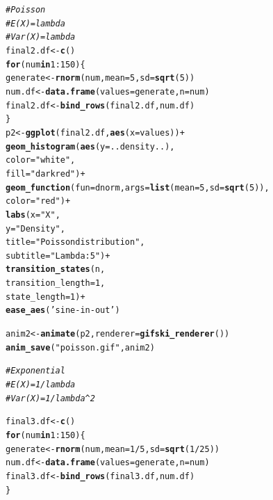 \documentclass{article}\usepackage[]{graphicx}\usepackage[]{color}
\makeatletter
\newcommand{\hlnum}[1]{\textcolor[rgb]{0.686,0.059,0.569}{#1}}%
\newcommand{\hlstr}[1]{\textcolor[rgb]{0.192,0.494,0.8}{#1}}%
\newcommand{\hlcom}[1]{\textcolor[rgb]{0.678,0.584,0.686}{\textit{#1}}}%
\newcommand{\hlopt}[1]{\textcolor[rgb]{0,0,0}{#1}}%
\newcommand{\hlstd}[1]{\textcolor[rgb]{0.345,0.345,0.345}{#1}}%
\newcommand{\hlkwa}[1]{\textcolor[rgb]{0.161,0.373,0.58}{\textbf{#1}}}%
\newcommand{\hlkwb}[1]{\textcolor[rgb]{0.69,0.353,0.396}{#1}}%
\newcommand{\hlkwc}[1]{\textcolor[rgb]{0.333,0.667,0.333}{#1}}%
\newcommand{\hlkwd}[1]{\textcolor[rgb]{0.737,0.353,0.396}{\textbf{#1}}}%
\newenvironment{kframe}{%
 \def\at@end@of@kframe{}%
 \ifinner\ifhmode%
  \def\at@end@of@kframe{\end{minipage}}%
  \begin{minipage}{\columnwidth}%
 \fi\fi%
 \def\FrameCommand##1{\hskip\@totalleftmargin \hskip-\fboxsep
 \colorbox{shadecolor}{##1}\hskip-\fboxsep
     \hskip-\linewidth \hskip-\@totalleftmargin \hskip\columnwidth}%
 \MakeFramed {\advance\hsize-\width
   \@totalleftmargin\z@ \linewidth\hsize
   \@setminipage}}%
 {\par\unskip\endMakeFramed%
 \at@end@of@kframe}
\newenvironment{knitrout}{}{} %
\makeatother
\begin{document}
\begin{knitrout}
\begin{kframe}
\begin{alltt}
\hlcom{#Poisson}
\hlcom{#E(X)=lambda}
\hlcom{#Var(X)=lambda}
\hlstd{final2.df} \hlkwb{<-} \hlkwd{c}\hlstd{()}
\hlkwa{for}\hlstd{(num} \hlkwa{in} \hlnum{1}\hlopt{:}\hlnum{150}\hlstd{)\{}
  \hlstd{generate} \hlkwb{<-} \hlkwd{rnorm}\hlstd{(num,} \hlkwc{mean}\hlstd{=}\hlnum{5}\hlstd{,} \hlkwc{sd}\hlstd{=}\hlkwd{sqrt}\hlstd{(}\hlnum{5}\hlstd{))}
  \hlstd{num.df} \hlkwb{<-} \hlkwd{data.frame}\hlstd{(}\hlkwc{values}\hlstd{=generate,} \hlkwc{n}\hlstd{=num)}
  \hlstd{final2.df}\hlkwb{<-}\hlkwd{bind_rows}\hlstd{(final2.df, num.df)}
\hlstd{\}}
\hlstd{p2}\hlkwb{<-}\hlkwd{ggplot}\hlstd{(final2.df,} \hlkwd{aes}\hlstd{(}\hlkwc{x}\hlstd{=values))}\hlopt{+}
  \hlkwd{geom_histogram}\hlstd{(}\hlkwd{aes}\hlstd{(}\hlkwc{y}\hlstd{=..density..),}
                 \hlkwc{color}\hlstd{=}\hlstr{"white"}\hlstd{,}
                 \hlkwc{fill}\hlstd{=}\hlstr{"dark red"}\hlstd{)}\hlopt{+}
  \hlkwd{geom_function}\hlstd{(}\hlkwc{fun}\hlstd{=dnorm,} \hlkwc{args}\hlstd{=}\hlkwd{list}\hlstd{(}\hlkwc{mean}\hlstd{=}\hlnum{5}\hlstd{,} \hlkwc{sd}\hlstd{=}\hlkwd{sqrt}\hlstd{(}\hlnum{5}\hlstd{)),}
                \hlkwc{color}\hlstd{=}\hlstr{"red"}\hlstd{)}\hlopt{+}
  \hlkwd{labs}\hlstd{(}\hlkwc{x}\hlstd{=}\hlstr{"X"}\hlstd{,}
       \hlkwc{y}\hlstd{=}\hlstr{"Density"}\hlstd{,}
       \hlkwc{title}\hlstd{=}\hlstr{"Poisson distribution"}\hlstd{,}
       \hlkwc{subtitle}\hlstd{=}\hlstr{"Lambda: 5"}\hlstd{)}\hlopt{+}
  \hlkwd{transition_states}\hlstd{(n,}
                    \hlkwc{transition_length} \hlstd{=} \hlnum{1}\hlstd{,}
                    \hlkwc{state_length} \hlstd{=} \hlnum{1}\hlstd{)}\hlopt{+}
  \hlkwd{ease_aes}\hlstd{(}\hlstr{'sine-in-out'}\hlstd{)}

\hlstd{anim2} \hlkwb{<-} \hlkwd{animate}\hlstd{(p2,} \hlkwc{renderer} \hlstd{=} \hlkwd{gifski_renderer}\hlstd{())}
\hlkwd{anim_save}\hlstd{(}\hlstr{"poisson.gif"}\hlstd{, anim2)}


\hlcom{#Exponential}
\hlcom{#E(X)=1/lambda}
\hlcom{#Var(X)=1/lambda^2}

\hlstd{final3.df} \hlkwb{<-} \hlkwd{c}\hlstd{()}
\hlkwa{for}\hlstd{(num} \hlkwa{in} \hlnum{1}\hlopt{:}\hlnum{150}\hlstd{)\{}
  \hlstd{generate} \hlkwb{<-} \hlkwd{rnorm}\hlstd{(num,} \hlkwc{mean}\hlstd{=}\hlnum{1}\hlopt{/}\hlnum{5}\hlstd{,} \hlkwc{sd}\hlstd{=}\hlkwd{sqrt}\hlstd{(}\hlnum{1}\hlopt{/}\hlnum{25}\hlstd{))}
  \hlstd{num.df} \hlkwb{<-} \hlkwd{data.frame}\hlstd{(}\hlkwc{values}\hlstd{=generate,} \hlkwc{n}\hlstd{=num)}
  \hlstd{final3.df}\hlkwb{<-}\hlkwd{bind_rows}\hlstd{(final3.df, num.df)}
\hlstd{\}}


\end{alltt}
\end{kframe}
\end{knitrout}
\end{document}
